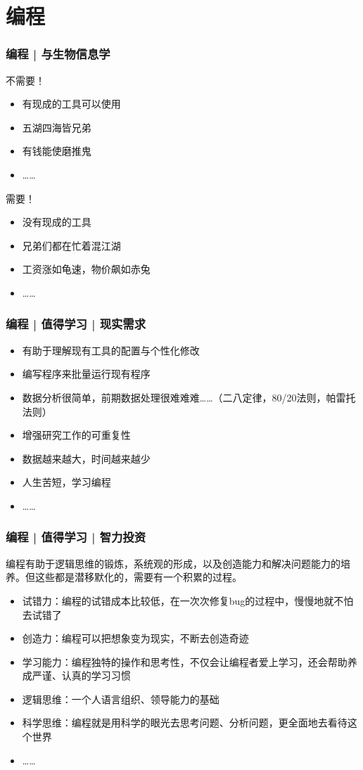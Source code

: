 \section{编程}
\begin{frame}
  \frametitle{编程 | 与生物信息学}
  \begin{block}{不需要！}
    \begin{itemize}
      \item 有现成的工具可以使用
      \item 五湖四海皆兄弟
      \item 有钱能使磨推鬼
      \item ……
    \end{itemize}
  \end{block}
  \pause
  \begin{block}{需要！}
    \begin{itemize}
      \item 没有现成的工具
      \item 兄弟们都在忙着混江湖
      \item 工资涨如龟速，物价飙如赤兔
      \item ……
    \end{itemize}
  \end{block}
\end{frame}

\begin{frame}
  \frametitle{编程 | 值得学习 | 现实需求}
  \begin{itemize}
    \item 有助于理解现有工具的配置与个性化修改
    \item 编写程序来批量运行现有程序
    \item 数据分析很简单，前期数据处理很难难难……（二八定律，80/20法则，帕雷托法则）
    \item 增强研究工作的可重复性
    \item 数据越来越大，时间越来越少
    \item 人生苦短，学习编程
    \item ……
  \end{itemize}
\end{frame}

\begin{frame}
  \frametitle{编程 | 值得学习 | 智力投资}
  编程有助于逻辑思维的锻炼，系统观的形成，以及创造能力和解决问题能力的培养。但这些都是潜移默化的，需要有一个积累的过程。
    \begin{itemize}
      \item 试错力：编程的试错成本比较低，在一次次修复bug的过程中，慢慢地就不怕去试错了
      \item 创造力：编程可以把想象变为现实，不断去创造奇迹
      \item 学习能力：编程独特的操作和思考性，不仅会让编程者爱上学习，还会帮助养成严谨、认真的学习习惯
      \item 逻辑思维：一个人语言组织、领导能力的基础
      \item 科学思维：编程就是用科学的眼光去思考问题、分析问题，更全面地去看待这个世界
      \item ……
    \end{itemize}
\end{frame}

